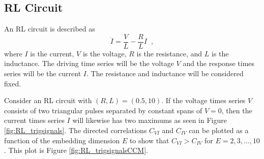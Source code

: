 \documentclass[a4paper,11pt]{article}
\begin{document}
\subsection{RL Circuit}
An RL circuit is described as
$$
\dot{I} = \frac{V}{L} - \frac{R}{L} I\;\;,
$$
where $I$ is the current, $V$ is the voltage, $R$ is the resistance, and $L$ is the inductance.  The driving time series will be the voltage $V$ and the response times series will be the current $I$.  The resistance and inductance will be considered fixed.

Consider an RL circuit with $(R,L) = (0.5,10)$.  If the voltage times series $V$ consists of two triangular pulses separated by constant spans of $V=0$, then the current times series $I$ will likewise has two maximums as seen in Figure \ref{fig:RL_trigsignals}.  The directed correlations $C_{VI}$ and $C_{IV}$ can be plotted as a function of the embedding dimension $E$ to show that $C_{VI}>C_{IV}$ for $E=2,3,\ldots,10$.  This plot is Figure \ref{fig:RL_trigsignalsCCM}.
\end{document}
